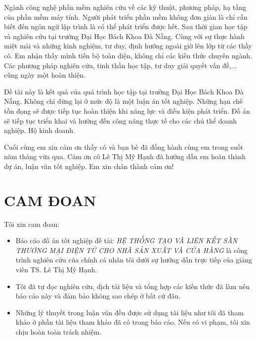 \documentclass[11pt]{report}
\newcommand{\project}{HỆ THỐNG TẠO VÀ LIÊN KẾT SÀN THƯƠNG MẠI ĐIỆN TỬ CHO NHÀ SẢN XUẤT VÀ CỬA HÀNG}
\newcommand{\advisor}{TS. Lê Thị Mỹ Hạnh}
\begin{document}
	Ngành công nghệ phần mềm nghiên cứu về các kỹ thuật, phương pháp, hạ tầng của phần mềm máy tính. Người phát triển phần mềm không đơn giản là chỉ cần biết đến ngôn ngữ lập trình là có thể phát triển được hết. Sau thời gian học tập và nghiên cứu tại trường Đại Học Bách Khoa Đà Nẵng. Cùng với sự thực hành miệt mài và những kinh nghiệm, tư duy, định hướng ngoài giờ lên lớp từ các thầy cô. Em nhận thấy mình tiến bộ toàn diện, không chỉ các kiến thức chuyên ngành. Các phương pháp nghiên cứu, tinh thần học tập, tư duy giải quyết vấn đề,... cũng ngày một hoàn thiện.
	
	
	Đề tài này là kết quả của quá trình học tập tại trường Đại Học Bách Khoa Đà Nẵng. Không chỉ dừng lại ở mức độ là một luận án tốt nghiệp. Những hạn chế tồn đọng sẽ được tiếp tục hoàn thiện khi năng lực và điều kiện phát triển. Đồ án sẽ tiếp tục triển khai và hướng đến công năng thực tế cho các chủ thể doanh nghiệp. Hộ kinh doanh.
	
	Cuối cùng em xin cảm ơn thầy cô và bạn bè đã đồng hành cùng em trong suốt năm tháng vừa qua. Cảm ơn cô Lê Thị Mỹ Hạnh đã hướng dẫn em hoàn thành dự án, luận văn tốt nghiệp. Em xin chân thành cảm ơn!
	
	\pagebreak
	
	\chapter*{CAM ĐOAN}
	\fontsize{13px}{13px}\selectfont\justifying
	
	Tôi xin cam đoan:
	\begin{itemize}
		\item Báo cáo đồ án tốt nghiệp đề tài: \emph{\project} là công trình nghiên cứu của chính cá nhân tôi dưới sự hướng dẫn trực tiếp của giảng viên \advisor.
		\item Tôi đã tự đọc nghiên cứu, dịch tài liệu và tổng hợp các kiến thức đã làm nên báo cáo này và đảm bảo không sao chép ở bất cứ đâu.
		\item Những lý thuyết trong luận văn đều được sử dụng tài liệu như tôi đã tham khảo ở phần tài liệu tham khảo đã có trong báo cáo. Nếu có vi phạm, tôi xin chịu hoàn toàn trách nhiệm.
	\end{itemize}
	
\end{document}

